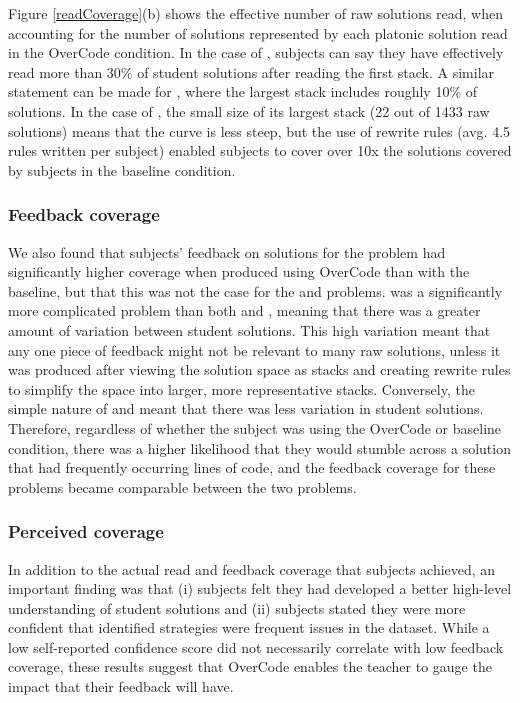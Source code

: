 Figure \ref{readCoverage}(b) shows the effective number of raw solutions read, when accounting for the number of solutions represented by each platonic solution read in the OverCode condition. In the case of , subjects can say they have effectively read more than 30\% of student solutions after reading the first stack. A similar statement can be made for , where the largest stack includes roughly 10\% of solutions. In the case of , the small size of its largest stack (22 out of 1433 raw solutions) means that the curve is less steep, but the use of rewrite rules (avg. 4.5 rules written per  subject) enabled subjects to cover over 10x the solutions covered by subjects in the baseline condition.

\subsubsection{Feedback coverage}
We also found that subjects' feedback on solutions for the  problem had significantly higher coverage when produced using OverCode than with the baseline, but that this was not the case for the  and  problems.  was a significantly more complicated problem than both  and , meaning that there was a greater amount of variation between student solutions. This high variation meant that any one piece of feedback might not be relevant to many raw solutions, unless it was produced after viewing the solution space as stacks and creating rewrite rules to simplify the space into larger, more representative stacks. Conversely, the simple nature of  and  meant that there was less variation in student solutions. Therefore, regardless of whether the subject was using the OverCode or baseline condition, there was a higher likelihood that they would stumble across a solution that had frequently occurring lines of code, and the feedback coverage for these problems became comparable between the two problems.

\subsubsection{Perceived coverage}
In addition to the actual read and feedback coverage that subjects achieved, an important finding was that (i) subjects felt they had developed a better high-level understanding of student solutions and (ii) subjects stated they were more confident that identified strategies were frequent issues in the dataset. While a low self-reported confidence score did not necessarily correlate with low feedback coverage, these results suggest that OverCode enables the teacher to gauge the impact that their feedback will have.

